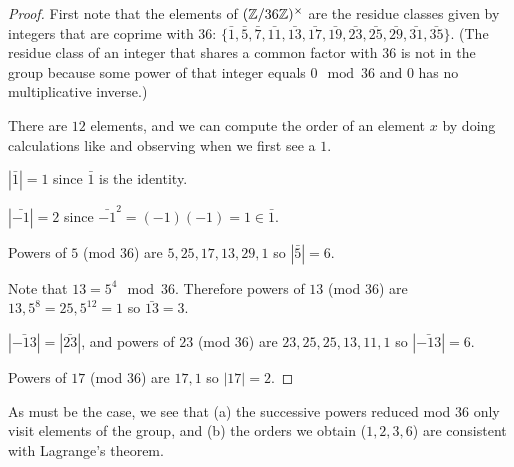 \begin{proof}
  First note that the elements of $(\mathbb{Z}/36\mathbb{Z})^\times$ are the residue classes given by integers that are
  coprime
  with
  $36$:
  $\{\bar{1}, \bar{5}, \bar{7}, \bar{11}, \bar{13}, \bar{17}, \bar{19}, \bar{23}, \bar{25}, \bar{29}, \bar{31}, \bar{35}\}$.
  (The residue class of an integer that shares a common factor with $36$ is not in the group
  because some power of that integer equals $0 \mod 36$ and $0$ has no multiplicative inverse.)

  There are $12$ elements, and we can compute the order of an element $x$ by doing calculations like
  and observing when we first see a $1$.

  $|\bar{1}| = 1$ since $\bar{1}$ is the identity.

  $|\bar{-1}| = 2$ since $\bar{-1}^2 = (-1)(-1) = 1 \in \bar{1}$.

  Powers of $5$ (mod $36$) are $5, 25, 17, 13, 29, 1$ so $|\bar{5}| = 6$.

  Note that $13 = 5^4 \mod 36$. Therefore powers of $13$ (mod $36$) are $13, 5^8 = 25, 5^{12} = 1$
  so $\bar{13} = 3$.

  $|\bar{-13}| = |\bar{23}|$, and powers of $23$ (mod $36$) are $23, 25, 25, 13, 11, 1$ so $|\bar{-13}| = 6$.

  Powers of $17$ (mod $36$) are $17, 1$ so $|17| = 2$.
\end{proof}

\begin{remark*}
  As must be the case, we see that (a) the successive powers reduced mod $36$ only visit elements
  of the group, and (b) the orders we obtain ($1, 2, 3, 6$) are consistent with Lagrange's theorem.
\end{remark*}



